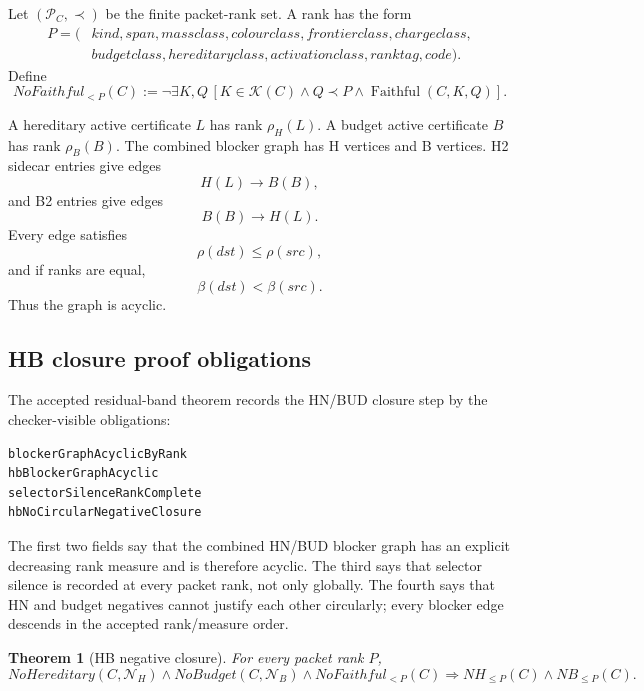 \documentclass[10.5pt,a4paper]{article}
\newtheorem{theorem}{Theorem}[section]
\newcommand{\Faithful}{\operatorname{Faithful}}
\begin{document}
Let \((\mathcal P_C,\prec)\) be the finite packet-rank set. A rank has the form
\[
\begin{aligned}
P=(&kind,span,massclass,colourclass,frontierclass,chargeclass,\\
&budgetclass,hereditaryclass,activationclass,ranktag,code).
\end{aligned}
\]
Define
\[
NoFaithful_{<P}(C):=\neg\exists K,Q\,[K\in\mathcal K(C)\wedge Q\prec P\wedge \Faithful(C,K,Q)].
\]

A hereditary active certificate \(L\) has rank \(\rho_H(L)\). A budget active certificate \(B\) has rank \(\rho_B(B)\). The combined blocker graph has H vertices and B vertices. H2 sidecar entries give edges
\[
H(L)\to B(B),
\]
and B2 entries give edges
\[
B(B)\to H(L).
\]
Every edge satisfies
\[
\rho(dst)\le \rho(src),
\]
and if ranks are equal,
\[
\beta(dst)<\beta(src).
\]
Thus the graph is acyclic.

\subsection{HB closure proof obligations}
The accepted residual-band theorem records the HN/BUD closure step by the checker-visible obligations:
\begin{lstlisting}
blockerGraphAcyclicByRank
hbBlockerGraphAcyclic
selectorSilenceRankComplete
hbNoCircularNegativeClosure
\end{lstlisting}
The first two fields say that the combined HN/BUD blocker graph has an explicit decreasing rank measure and is therefore acyclic.  The third says that selector silence is recorded at every packet rank, not only globally.  The fourth says that HN and budget negatives cannot justify each other circularly; every blocker edge descends in the accepted rank/measure order.

\begin{theorem}[HB negative closure]
For every packet rank \(P\),
\[
NoHereditary(C,\mathcal N_H)\wedge NoBudget(C,\mathcal N_B)\wedge NoFaithful_{<P}(C)
\Longrightarrow
NH_{\le P}(C)\wedge NB_{\le P}(C).
\]
\end{theorem}
\end{document}

